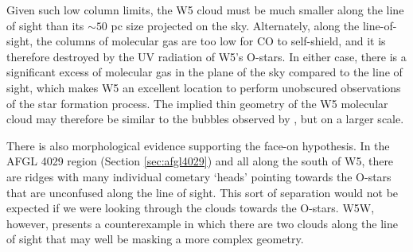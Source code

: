 
Given such low column limits,  the W5 cloud must be much smaller along the line
of sight than its $\sim50$ pc size projected on the sky.  Alternately, along
the line-of-sight, the columns of molecular gas are too low for CO to
self-shield, and it is therefore destroyed by the UV radiation of W5's O-stars.
In either case, there is a significant excess of molecular gas in the plane of
the sky compared to the line of sight, which makes W5 an excellent location to
perform unobscured observations of the star formation process.  The implied
thin geometry of the W5 molecular cloud may therefore be similar to the bubbles
observed by \citet{Beaumont2009}, but on a larger scale.

There is also morphological evidence supporting the face-on
hypothesis.  In the AFGL 4029 region (Section \ref{sec:afgl4029}) and all along
the south of W5, there are ridges with many individual cometary `heads'
pointing towards the O-stars that are unconfused along the line of sight.  This
sort of separation would not be expected if we were looking through the clouds
towards the O-stars.  W5W, however, presents a counterexample in which there
are two clouds along the line of sight that may well be masking a more complex
geometry.


